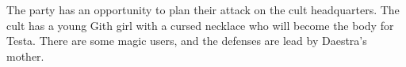 The party has an opportunity to plan their attack on the cult headquarters.
The cult has a young Gith girl with a cursed necklace who will become the body for Testa.
There are some magic users, and the defenses are lead by Daestra's mother.
